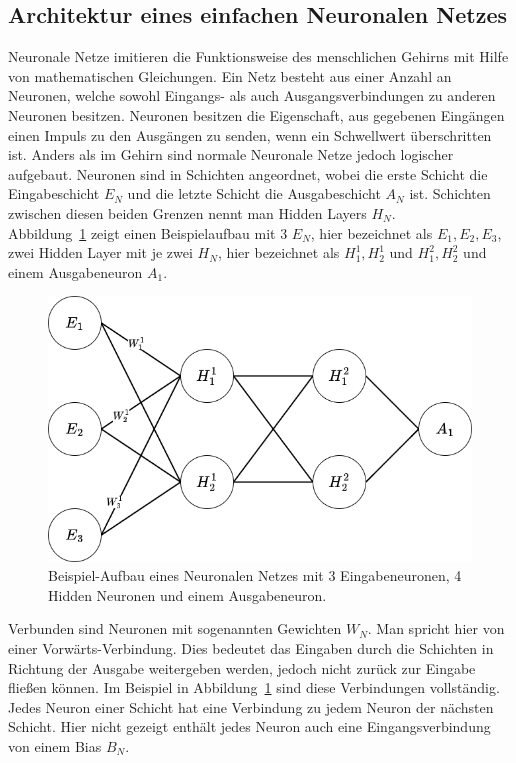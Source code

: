 \subsection{Architektur eines einfachen Neuronalen Netzes}
Neuronale Netze imitieren die Funktionsweise des menschlichen Gehirns mit Hilfe von mathematischen Gleichungen. Ein Netz besteht aus einer Anzahl an Neuronen, welche sowohl Eingangs- als auch Ausgangsverbindungen zu anderen Neuronen besitzen.
Neuronen besitzen die Eigenschaft, aus gegebenen Eingängen einen Impuls zu den Ausgängen zu senden, wenn ein Schwellwert überschritten ist.
Anders als im Gehirn sind normale Neuronale Netze jedoch logischer aufgebaut.
Neuronen sind in Schichten angeordnet, wobei die erste Schicht die Eingabeschicht $E_N$ und die letzte Schicht die Ausgabeschicht $A_N$ ist. Schichten zwischen diesen beiden Grenzen nennt man Hidden Layers $H_N$.\\

Abbildung~\ref{nn_simple} zeigt einen Beispielaufbau mit 3 $E_N$, hier bezeichnet als $E_1,E_2,E_3$, zwei Hidden Layer mit je zwei $H_N$, hier bezeichnet als $H^1_1, H^1_2$ und $H^2_1, H^2_2$ und einem Ausgabeneuron $A_1$.
\begin{figure}
    \centering
    \includegraphics[width=\textwidth]{zeichnungen/nn.png}
    \caption{Beispiel-Aufbau eines Neuronalen Netzes mit 3 Eingabeneuronen, 4 Hidden Neuronen und einem Ausgabeneuron.}\label{nn_simple}
\end{figure}

Verbunden sind Neuronen mit sogenannten Gewichten $W_N$. Man spricht hier von einer Vorwärts-Verbindung. Dies bedeutet das Eingaben durch die Schichten in Richtung der Ausgabe weitergeben werden, jedoch nicht zurück zur Eingabe fließen können.
Im Beispiel in Abbildung~\ref{nn_simple} sind diese Verbindungen vollständig. Jedes Neuron einer Schicht hat eine Verbindung zu jedem Neuron der nächsten Schicht.
Hier nicht gezeigt enthält jedes Neuron auch eine Eingangsverbindung von einem Bias $B_N$.

